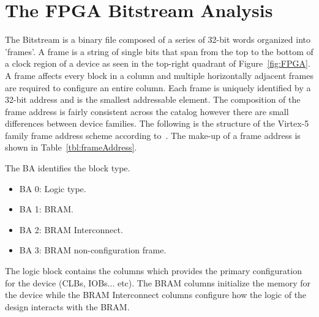 \section{The \acrshort{FPGA} \gls{Bitstream} Analysis} \label{sec:fpgaBitStream}
The \Xilinx \gls{Bitstream} is a binary file composed of a series of 32-bit words organized into 'frames'.
A frame is a string of single bits that span from the top to the bottom of a clock region of a device as seen in the top-right quadrant of Figure~\ref{fig:FPGA}.
A frame affects every block in a column and multiple horizontally adjacent frames are required to configure an entire column.
Each frame is uniquely identified by a 32-bit address and is the smallest addressable element.
The composition of the frame address is fairly consistent across the \Xilinx catalog however there are small differences between device families.
The following is the structure of the Virtex-5 family frame address scheme according to~\cite{virtex5ConfigGuide}.
The make-up of a frame address is shown in Table~\ref{tbl:frameAddress}.
\begin{table}[h]
	\centering
	\caption{Frame Address}
	\label{tbl:frameAddress}
\end{table}
The \acrfull{BA} identifies the block type.
\begin{itemize}
	\item BA 0: Logic type.
	\item BA 1: \acrfull{BRAM}.
	\item BA 2: \acrshort{BRAM} Interconnect.
	\item BA 3: \acrshort{BRAM} non-configuration frame.
\end{itemize}
The logic block contains the columns which provides the primary configuration for the device (\acrshort{CLBs}, \acrshort{IOBs}... etc).
The \acrshort{BRAM} columns initialize the memory for the device while the \acrshort{BRAM} Interconnect columns configure how the logic of the design interacts with the \acrshort{BRAM}.

